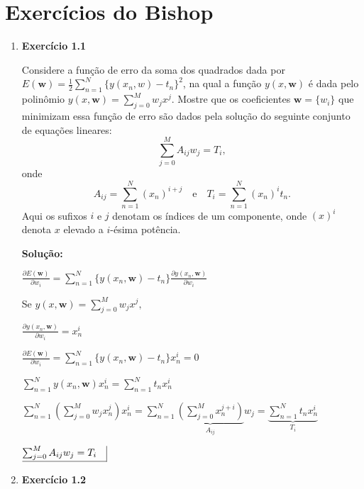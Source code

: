 \section*{Exercícios do Bishop}

\begin{enumerate}


\item \textbf{Exercício 1.1} \par

Considere a função de erro da soma dos quadrados dada por $E(\boldsymbol{w})=\frac{1}{2}\sum_{n=1}^{N} \{y(x_n,w)-t_n\}^2$, na qual a função $y(x,\boldsymbol{w})$ é dada pelo polinômio $y(x,\boldsymbol{w})=\sum_{j=0}^{M} w_jx^j$. Mostre que os coeficientes $\boldsymbol{w} = \{w_i\}$ que minimizam essa função de erro são dados pela solução do seguinte conjunto de equações lineares:
\begin{equation*}
    \sum_{j=0}^{M}A_{ij} w_j = T_i, 
\end{equation*}
onde 
\begin{equation*}
    A_{ij} = \sum_{n=1}^{N} (x_n)^{i+j} \quad \text{e} \quad T_i=\sum_{n=1}^{N} (x_n)^i t_n.
\end{equation*}
Aqui os sufixos $i$ e $j$ denotam os índices de um componente, onde $(x)^i$ denota $x$ elevado a $i$-ésima potência.
\newline \par
\textbf{Solução:}

$\frac{\partial E(\boldsymbol{w})}{\partial w_i} = \sum_{n=1}^{N} \{y(x_n, \boldsymbol{w}) - t_n\} \frac{\partial y(x_n, \boldsymbol{w})}{\partial w_i}$ 

Se $y(x,\boldsymbol{w})=\sum_{j=0}^{M} w_j x^j,$ 

$\frac{\partial y(x_n, \boldsymbol{w})}{\partial w_i} = x_n^i $

$ \frac{\partial E(\boldsymbol{w})}{\partial w_i} = \sum_{n=1}^{N} \{y(x_n, \boldsymbol{w}) - t_n\} x_n^i = 0 $

$\sum_{n=1}^{N} y(x_n, \boldsymbol{w})x_n^i = \sum_{n=1}^{N} t_n x_n^i$

$\sum_{n=1}^{N} \left( \sum_{j=0}^{M} w_j x_n^j \right) x_n^i = \sum_{n=1}^{N} \underbrace{\left( \sum_{j=0}^{M} x_n^{j+i} \right)}_{A_{ij}} w_j = \underbrace{\sum_{n=1}^{N} t_n x_n^i}_{T_i}$

$ \underline{\sum_{j=0}^{M}A_{ij} w_j = T_i\quad} \vline $

\item \textbf{Exercício 1.2} \par


\end{enumerate}
